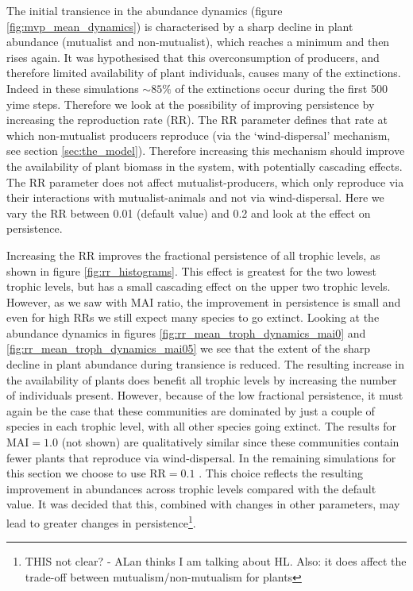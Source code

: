 The initial transience in the abundance dynamics (figure \ref{fig:mvp_mean_dynamics}) is characterised by a sharp decline in plant abundance (mutualist and non-mutualist), which reaches a minimum and then rises again. It was hypothesised that this overconsumption of producers, and therefore limited availability of plant individuals, causes many of the extinctions. Indeed in these simulations $\sim 85\%$ of the extinctions occur during the first 500 yime steps. Therefore we look at the possibility of improving persistence by increasing the reproduction rate (RR). The RR parameter defines that rate at which non-mutualist producers reproduce (via the `wind-dispersal' mechanism, see section \ref{sec:the_model}). Therefore increasing this mechanism should improve the availability of plant biomass in the system, with potentially cascading effects. The RR parameter does not affect mutualist-producers, which only reproduce via their interactions with mutualist-animals and not via wind-dispersal. Here we vary the RR between 0.01 (default value) and 0.2 and look at the effect on persistence.

Increasing the RR improves the fractional persistence of all trophic levels, as shown in figure \ref{fig:rr_histograms}. This effect is greatest for the two lowest trophic levels, but has a small cascading effect on the upper two trophic levels. However, as we saw with MAI ratio, the improvement in persistence is small and even for high RRs we still expect many species to go extinct. Looking at the abundance dynamics in figures \ref{fig:rr_mean_troph_dynamics_mai0} and \ref{fig:rr_mean_troph_dynamics_mai05} we see that the extent of the sharp decline in plant abundance during transience is reduced. The resulting increase in the availability of plants does benefit all trophic levels by increasing the number of individuals present. However, because of the low fractional persistence, it must again be the case that these communities are dominated by just a couple of species in each trophic level, with all other species going extinct. The results for MAI$=1.0$ (not shown) are qualitatively similar since these communities contain fewer plants that reproduce via wind-dispersal. In the remaining simulations for this section we choose to use RR$=0.1$ . This choice reflects the resulting improvement in abundances across trophic levels compared with the default value. It was decided that this, combined with changes in other parameters, may lead to greater changes in persistence\footnote{THIS not clear? - ALan thinks I am talking about HL. Also: it does affect the trade-off between mutualism/non-mutualism for plants}.


